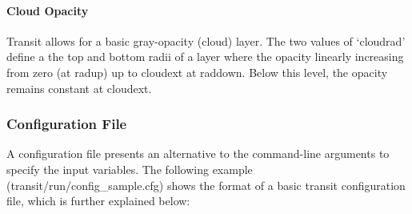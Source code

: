 \documentclass[letterpaper, 12pt]{article}
\begin{document}
\paragraph{Cloud Opacity}

Transit allows for a basic gray-opacity (cloud) layer.  The two values
of {\tttm `cloudrad'} define a the top and bottom radii of a layer
where the opacity linearly increasing from zero (at {\tttb radup}) up
to {\tttb cloudext} at {\tttb raddown}.  Below this level, the
opacity remains constant at {\tttb cloudext}.


\subsubsection{Configuration File}
\label{sec:transitcfg}

A configuration file presents an alternative to the command-line
arguments to specify the input variables.  The following example
({\tttb transit/run/config\_sample.cfg}) shows the format of a basic
transit configuration file, which is further explained below: \newline
\end{document}
